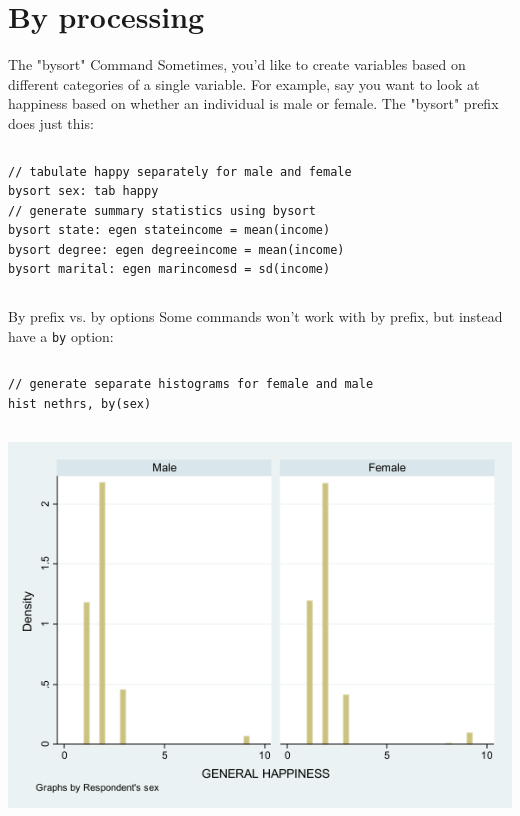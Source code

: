\documentclass[table,smaller]{beamer}
\begin{document}
\section{By processing}
\label{sec-3}

\begin{frame}[fragile,label=sec-3-1]{The "bysort" Command}
 Sometimes, you'd like to create variables based on different categories of a single variable. For example, say you want to look at happiness based on whether an individual is male or female. The "bysort" prefix does just this:

\vspace{-.5em} \begin{columns}  \begin{block}{}
\begin{verbatim}
// tabulate happy separately for male and female 
bysort sex: tab happy
// generate summary statistics using bysort 
bysort state: egen stateincome = mean(income)
bysort degree: egen degreeincome = mean(income)
bysort marital: egen marincomesd = sd(income)
\end{verbatim}
\end{block} \end{columns}
\end{frame}
\begin{frame}[fragile,label=sec-3-2]{By prefix vs. by options}
 Some commands won't work with by prefix, but instead have a \verb~by~ option:

\vspace{-.5em} \begin{columns}  \begin{block}{}
\begin{verbatim}
// generate separate histograms for female and male 
hist nethrs, by(sex)
\end{verbatim}
\end{block} \end{columns}

\includegraphics[width=.9\linewidth]{images/histBysex.png}
\end{frame}
\end{document}
